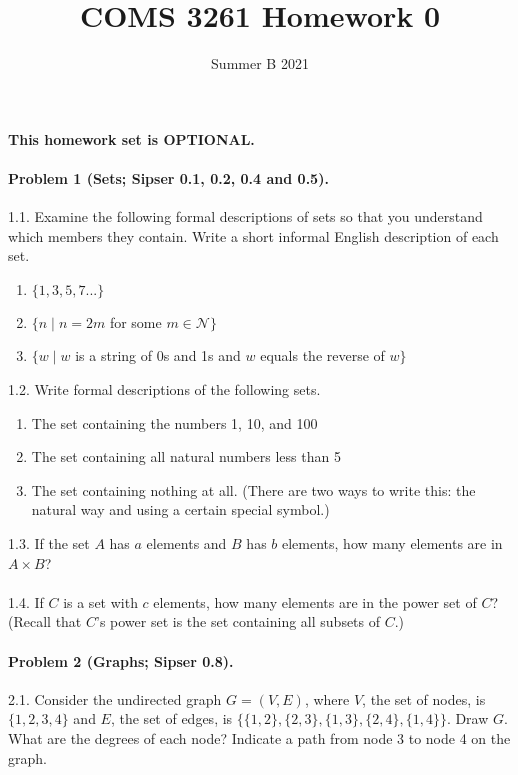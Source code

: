 \documentclass[letterpaper,11pt,twoside]{article}
\title{COMS 3261 Homework 0}
\date{Summer B 2021}
\theoremstyle{plain}
\theoremstyle{definition}
\theoremstyle{remark}
\theoremstyle{restate}
\begin{document}
\maketitle

\textbf{This homework set is OPTIONAL. }

\paragraph{Problem 1 (Sets; Sipser 0.1, 0.2, 0.4 and 0.5).}

1.1. Examine the following formal descriptions of sets so that you understand which members they contain. Write a short informal English description of each set.
\begin{enumerate}
    \item $\{1, 3, 5, 7...\}$
    \item $\{n \; | \; n = 2m$ for some $m \in \mathcal{N}\}$
    \item $\{w \; | \; w$ is a string of 0s and 1s and $w$ equals the reverse of $w\}$
\end{enumerate}
1.2. Write formal descriptions of the following sets.
\begin{enumerate}
    \item The set containing the numbers 1, 10, and 100
    \item The set containing all natural numbers less than 5
    \item The set containing nothing at all. (There are two ways to write this: the natural way and using a certain special symbol.)
\end{enumerate}
1.3. If the set $A$ has $a$ elements and $B$ has $b$ elements, how many elements are in $A \times B$? \\
\\
1.4. If $C$ is a set with $c$ elements, how many elements are in the power set of $C$? (Recall that $C$'s power set is the set containing all subsets of $C$.)

\paragraph{Problem 2 (Graphs; Sipser 0.8).}

2.1. Consider the undirected graph $G = (V, E)$, where $V$, the set of nodes, is $\{1, 2, 3, 4\}$ and $E$, the set of edges, is $\{\{1, 2\}, \{2, 3\}, \{1, 3\}, \{2, 4\}, \{1, 4\}\}$. Draw $G$. What are the degrees of each node? Indicate a path from node 3 to node 4 on the graph.
\end{document}
